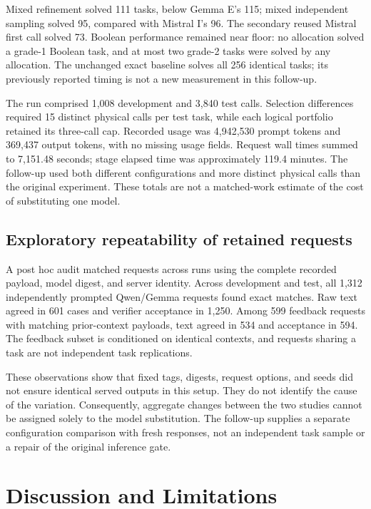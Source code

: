 Mixed refinement solved 111 tasks, below Gemma E's 115; mixed independent sampling solved 95, compared with Mistral I's 96. The secondary reused Mistral first call solved 73. Boolean performance remained near floor: no allocation solved a grade-1 Boolean task, and at most two grade-2 tasks were solved by any allocation. The unchanged exact baseline solves all 256 identical tasks; its previously reported timing is not a new measurement in this follow-up.

The run comprised 1,008 development and 3,840 test calls. Selection differences required 15 distinct physical calls per test task, while each logical portfolio retained its three-call cap. Recorded usage was 4,942,530 prompt tokens and 369,437 output tokens, with no missing usage fields. Request wall times summed to 7,151.48 seconds; stage elapsed time was approximately 119.4 minutes. The follow-up used both different configurations and more distinct physical calls than the original experiment. These totals are not a matched-work estimate of the cost of substituting one model.

\subsection{Exploratory repeatability of retained requests}

A post hoc audit matched requests across runs using the complete recorded payload, model digest, and server identity. Across development and test, all 1,312 independently prompted Qwen/Gemma requests found exact matches. Raw text agreed in 601 cases and verifier acceptance in 1,250. Among 599 feedback requests with matching prior-context payloads, text agreed in 534 and acceptance in 594. The feedback subset is conditioned on identical contexts, and requests sharing a task are not independent task replications.

These observations show that fixed tags, digests, request options, and seeds did not ensure identical served outputs in this setup. They do not identify the cause of the variation. Consequently, aggregate changes between the two studies cannot be assigned solely to the model substitution. The follow-up supplies a separate configuration comparison with fresh responses, not an independent task sample or a repair of the original inference gate.

\section{Discussion and Limitations}

